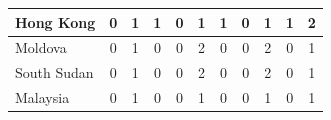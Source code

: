 \documentclass[12pt]{article}  %
\begin{document}
\begin{subappendices}
\begin{longtable}{|l|c|c|c|c|c|c|c|c|c|c|}
	\hline
	Hong Kong                                                      & 0                                                                      & 1                                                                      & 1                                                                      & 0                                                                      & 1                                                                      & 1                                                                      & 0                         & 1                           & 1                           & 2                           \\ 
	\hline
	Moldova                                                        & 0                                                                      & 1                                                                      & 0                                                                      & 0                                                                      & 2                                                                      & 0                                                                      & 0                         & 2                           & 0                           & 1                           \\ 
	\hline
	South Sudan                                                    & 0                                                                      & 1                                                                      & 0                                                                      & 0                                                                      & 2                                                                      & 0                                                                      & 0                         & 2                           & 0                           & 1                           \\ 
	\hline
	Malaysia                                                       & 0                                                                      & 1                                                                      & 0                                                                      & 0                                                                      & 1                                                                      & 0                                                                      & 0                         & 1                           & 0                           & 1                           \\ 

\end{longtable}
\end{subappendices}
\end{document}
